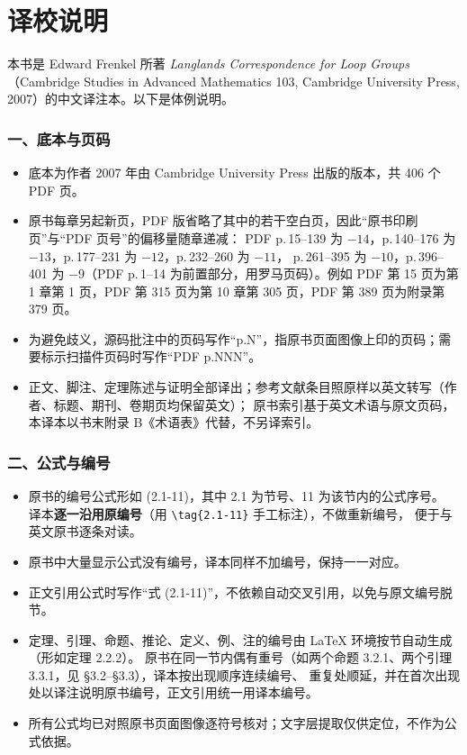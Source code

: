 \chapter*{译校说明}

本书是 Edward Frenkel 所著 \emph{Langlands Correspondence for Loop Groups}（Cambridge Studies in
Advanced Mathematics 103, Cambridge University Press, 2007）的中文译注本。以下是体例说明。

\subsection*{一、底本与页码}

\begin{itemize}[leftmargin=1.8em]
    \item 底本为作者 2007 年由 Cambridge University Press 出版的版本，共 406 个 PDF 页。
    \item 原书每章另起新页，PDF 版省略了其中的若干空白页，因此“原书印刷页”与“PDF 页号”的偏移量随章递减：
          PDF p.\,15--139 为 $-14$，p.\,140--176 为 $-13$，p.\,177--231 为 $-12$，p.\,232--260 为 $-11$，
          p.\,261--395 为 $-10$，p.\,396--401 为 $-9$（PDF p.\,1--14 为前置部分，用罗马页码）。例如 PDF 第 15 页为第 1 章第 1 页，PDF 第 315 页为第 10 章第 305 页，PDF 第 389 页为附录第 379 页。
    \item 为避免歧义，源码批注中的页码写作“p.N”，指原书页面图像上印的页码；需要标示扫描件页码时写作“PDF p.NNN”。
    \item 正文、脚注、定理陈述与证明全部译出；参考文献条目照原样以英文转写（作者、标题、期刊、卷期页均保留英文）；
          原书索引基于英文术语与原文页码，本译本以书末附录 B《术语表》代替，不另译索引。
\end{itemize}

\subsection*{二、公式与编号}

\begin{itemize}[leftmargin=1.8em]
    \item 原书的编号公式形如 (2.1-11)，其中 2.1 为节号、11 为该节内的公式序号。
          译本\textbf{逐一沿用原编号}（用 \verb|\tag{2.1-11}| 手工标注），不做重新编号，
          便于与英文原书逐条对读。
    \item 原书中大量显示公式没有编号，译本同样不加编号，保持一一对应。
    \item 正文引用公式时写作“式 (2.1-11)”，不依赖自动交叉引用，以免与原文编号脱节。
    \item 定理、引理、命题、推论、定义、例、注的编号由 \LaTeX{} 环境按节自动生成（形如定理 2.2.2）。
          原书在同一节内偶有重号（如两个命题 3.2.1、两个引理 3.3.1，见 §3.2--§3.3），译本按出现顺序连续编号、
          重复处顺延，并在首次出现处以译注说明原书编号，正文引用统一用译本编号。
    \item 所有公式均已对照原书页面图像逐符号核对；文字层提取仅供定位，不作为公式依据。
\end{itemize}

